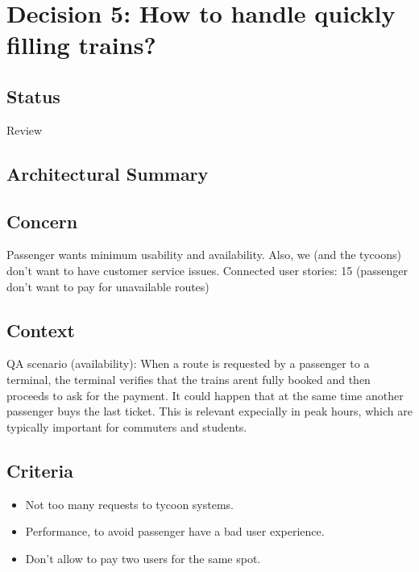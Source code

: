 \section*{Decision 5: How to handle quickly filling trains?}

\subsection*{Status}
Review

\subsection*{Architectural Summary}

\subsection*{Concern}
Passenger wants minimum usability and availability. Also, we (and the tycoons) don't want to have customer service issues.
Connected user stories: 15 (passenger don't want to pay for unavailable routes)

\subsection*{Context}
QA scenario (availability): When a route is requested by a passenger to a terminal, the terminal verifies that the trains arent fully booked and then proceeds to
ask for the payment.
It could happen that at the same time another passenger buys the last ticket. This is relevant expecially in peak hours, which are typically important for commuters and students.

\subsection*{Criteria}
\begin{itemize}
\item Not too many requests to tycoon systems.
\item Performance, to avoid passenger have a bad user experience.
\item Don't allow to pay two users for the same spot.
\end{itemize}

